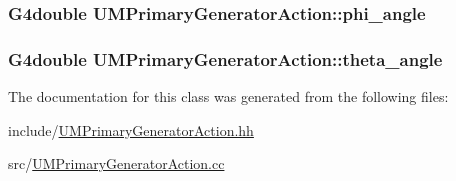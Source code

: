 \subsubsection[{phi\+\_\+angle}]{\setlength{\rightskip}{0pt plus 5cm}G4double U\+M\+Primary\+Generator\+Action\+::phi\+\_\+angle\hspace{0.3cm}{\ttfamily [private]}}\label{classUMPrimaryGeneratorAction_a4de1dd00da08850d4d260248fff6f2ae}
\hypertarget{classUMPrimaryGeneratorAction_a254fcb36e5b52349847120db69071ec9}{}
\subsubsection[{theta\+\_\+angle}]{\setlength{\rightskip}{0pt plus 5cm}G4double U\+M\+Primary\+Generator\+Action\+::theta\+\_\+angle\hspace{0.3cm}{\ttfamily [private]}}\label{classUMPrimaryGeneratorAction_a254fcb36e5b52349847120db69071ec9}


The documentation for this class was generated from the following files\+:\begin{DoxyCompactItemize}
\item 
include/\hyperlink{UMPrimaryGeneratorAction_8hh}{U\+M\+Primary\+Generator\+Action.\+hh}\item 
src/\hyperlink{UMPrimaryGeneratorAction_8cc}{U\+M\+Primary\+Generator\+Action.\+cc}\end{DoxyCompactItemize}
